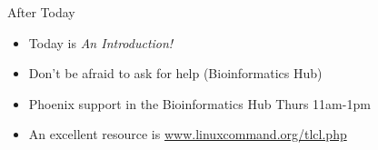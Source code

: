 \documentclass[11pt]{beamer}
\begin{document}
\begin{frame}{After Today}
	\begin{itemize}
		\item Today is \textit{An Introduction!}
		\item Don't be afraid to ask for help (Bioinformatics Hub)
		\item Phoenix support in the Bioinformatics Hub Thurs 11am-1pm
		\item An excellent resource is \url{www.linuxcommand.org/tlcl.php}
	\end{itemize}
\end{frame}
\end{document}
